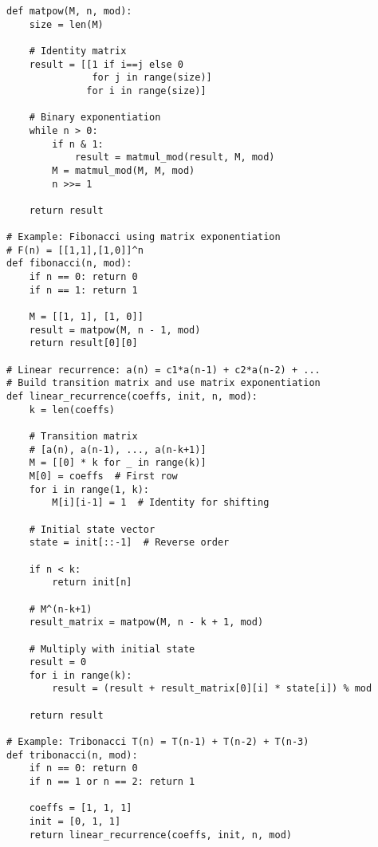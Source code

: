 \begin{lstlisting}
def matpow(M, n, mod):
    size = len(M)
    
    # Identity matrix
    result = [[1 if i==j else 0 
               for j in range(size)] 
              for i in range(size)]
    
    # Binary exponentiation
    while n > 0:
        if n & 1:
            result = matmul_mod(result, M, mod)
        M = matmul_mod(M, M, mod)
        n >>= 1
    
    return result

# Example: Fibonacci using matrix exponentiation
# F(n) = [[1,1],[1,0]]^n
def fibonacci(n, mod):
    if n == 0: return 0
    if n == 1: return 1
    
    M = [[1, 1], [1, 0]]
    result = matpow(M, n - 1, mod)
    return result[0][0]

# Linear recurrence: a(n) = c1*a(n-1) + c2*a(n-2) + ...
# Build transition matrix and use matrix exponentiation
def linear_recurrence(coeffs, init, n, mod):
    k = len(coeffs)
    
    # Transition matrix
    # [a(n), a(n-1), ..., a(n-k+1)]
    M = [[0] * k for _ in range(k)]
    M[0] = coeffs  # First row
    for i in range(1, k):
        M[i][i-1] = 1  # Identity for shifting
    
    # Initial state vector
    state = init[::-1]  # Reverse order
    
    if n < k:
        return init[n]
    
    # M^(n-k+1)
    result_matrix = matpow(M, n - k + 1, mod)
    
    # Multiply with initial state
    result = 0
    for i in range(k):
        result = (result + result_matrix[0][i] * state[i]) % mod
    
    return result

# Example: Tribonacci T(n) = T(n-1) + T(n-2) + T(n-3)
def tribonacci(n, mod):
    if n == 0: return 0
    if n == 1 or n == 2: return 1
    
    coeffs = [1, 1, 1]
    init = [0, 1, 1]
    return linear_recurrence(coeffs, init, n, mod)
\end{lstlisting}
